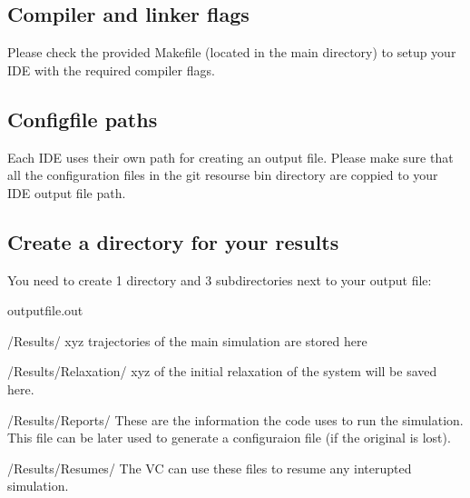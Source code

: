 \subsection*{Compiler and linker flags}

Please check the provided Makefile (located in the main directory) to setup your I\+DE with the required compiler flags.

\subsection*{Configfile paths}

Each I\+DE uses their own path for creating an output file. Please make sure that all the configuration files in the git resourse bin directory are coppied to your I\+DE output file path.

\subsection*{Create a directory for your results}

You need to create 1 directory and 3 subdirectories next to your output file\+:

outputfile.\+out

/\+Results/ xyz trajectories of the main simulation are stored here

/\+Results/\+Relaxation/ xyz of the initial relaxation of the system will be saved here.

/\+Results/\+Reports/ These are the information the code uses to run the simulation. This file can be later used to generate a configuraion file (if the original is lost).

/\+Results/\+Resumes/ The VC can use these files to resume any interupted simulation. 